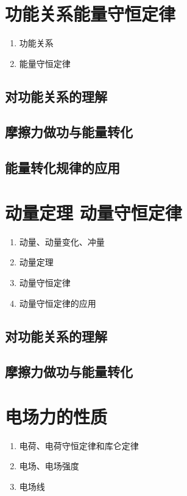 \documentclass[cn,11pt,mac, simple]{elegantbook}
\begin{document}
\chapter{功能关系能量守恒定律}
\begin{enumerate}
   \item 功能关系
   \item 能量守恒定律
\end{enumerate}

\clearpage\section{对功能关系的理解}

\clearpage\section{摩擦力做功与能量转化}

\clearpage\section{能量转化规律的应用}


\chapter{动量定理 动量守恒定律}
\begin{enumerate}
   \item 动量、动量变化、冲量
   \item 动量定理
   \item 动量守恒定律
   \item 动量守恒定律的应用
\end{enumerate}

\clearpage\section{对功能关系的理解}

\clearpage\section{摩擦力做功与能量转化}


\chapter{电场力的性质}
\begin{enumerate}
   \item 电荷、电荷守恒定律和库仑定律
   \item 电场、电场强度
   \item 电场线
\end{enumerate}
\end{document}

